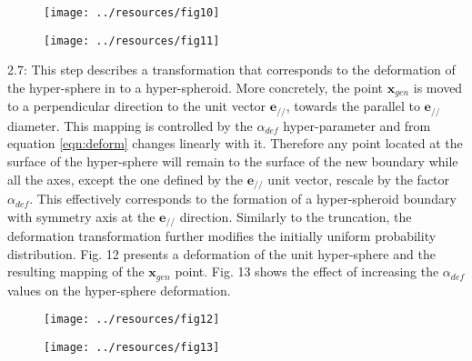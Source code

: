 \documentclass[parskip=full]{scrartcl}
\begin{document}
\begin{figure}[H]
	\centering
	\texttt{[image: ../resources/fig10]}
\end{figure}

\begin{figure}[H]
	\centering
	\texttt{[image: ../resources/fig11]}
\end{figure}

2.7: This step describes a transformation that corresponds to the deformation of the hyper-sphere in to a hyper-spheroid. More concretely, the point \( \textbf{x}_{gen} \) is moved to a perpendicular direction to the unit vector \( \textbf{e}_{\scriptscriptstyle//} \), towards the parallel to \( \textbf{e}_{\scriptscriptstyle//} \) diameter. This mapping is controlled by the \( \alpha_{def} \) hyper-parameter and from equation \eqref{eqn:deform} changes linearly with it. Therefore any point located at the surface of the hyper-sphere will remain to the surface of the new boundary while all the axes, except the one defined by the \( \textbf{e}_{\scriptscriptstyle//} \) unit vector, rescale by the factor \( \alpha_{def} \). This effectively corresponds to the formation of a hyper-spheroid boundary with symmetry axis at the \( \textbf{e}_{\scriptscriptstyle//} \) direction. Similarly to the truncation, the deformation transformation further modifies the initially uniform probability distribution. Fig. 12 presents a deformation of the unit hyper-sphere and the resulting mapping of the \( \textbf{x}_{gen} \) point. Fig. 13 shows the effect of increasing the \( \alpha_{def} \) values on the hyper-sphere deformation.

\begin{figure}[H]
	\centering
	\texttt{[image: ../resources/fig12]}
\end{figure}

\begin{figure}[H]
	\centering
	\texttt{[image: ../resources/fig13]}
\end{figure}
\end{document}
